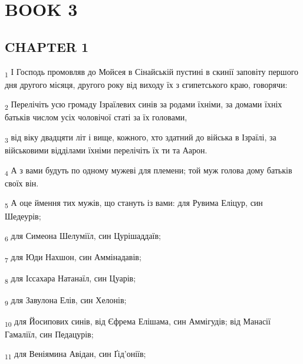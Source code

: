 \section{BOOK 3}
\subsection{CHAPTER 1}
\begin{tcolorbox}
\textsubscript{1} І Господь промовляв до Мойсея в Сінайській пустині в скинії заповіту першого дня другого місяця, другого року від виходу їх з єгипетського краю, говорячи:
\end{tcolorbox}
\begin{tcolorbox}
\textsubscript{2} Перелічіть усю громаду Ізраїлевих синів за родами їхніми, за домами їхніх батьків числом усіх чоловічої статі за їх головами,
\end{tcolorbox}
\begin{tcolorbox}
\textsubscript{3} від віку двадцяти літ і вище, кожного, хто здатний до війська в Ізраїлі, за військовими відділами їхніми перелічіть їх ти та Аарон.
\end{tcolorbox}
\begin{tcolorbox}
\textsubscript{4} А з вами будуть по одному мужеві для племени; той муж голова дому батьків своїх він.
\end{tcolorbox}
\begin{tcolorbox}
\textsubscript{5} А оце ймення тих мужів, що стануть із вами: для Рувима Еліцур, син Шедеурів;
\end{tcolorbox}
\begin{tcolorbox}
\textsubscript{6} для Симеона Шелуміїл, син Цурішаддаїв;
\end{tcolorbox}
\begin{tcolorbox}
\textsubscript{7} для Юди Нахшон, син Аммінадавів;
\end{tcolorbox}
\begin{tcolorbox}
\textsubscript{8} для Іссахара Натанаїл, син Цуарів;
\end{tcolorbox}
\begin{tcolorbox}
\textsubscript{9} для Завулона Елів, син Хелонів;
\end{tcolorbox}
\begin{tcolorbox}
\textsubscript{10} для Йосипових синів, від Єфрема Елішама, син Аммігудів; від Манасії Гамаліїл, син Педацурів;
\end{tcolorbox}
\begin{tcolorbox}
\textsubscript{11} для Веніямина Авідан, син Ґід'оніїв;
\end{tcolorbox}
